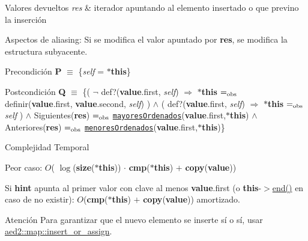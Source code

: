 \begin{DoxyRetVals}{Valores devueltos}
{\em res} & iterador apuntando al elemento insertado o que previno la inserción\\
\hline
\end{DoxyRetVals}
\begin{DoxyParagraph}{Aspectos de aliasing\-:}
Si se modifica el valor apuntado por {\bfseries res}, se modifica la estructura subyacente.
\end{DoxyParagraph}
\begin{DoxyPrecond}{Precondición}
{\bfseries P} $\equiv$ \{{\itshape self} = {\bfseries $\ast$this}\} 
\end{DoxyPrecond}
\begin{DoxyPostcond}{Postcondición}
{\bfseries Q} $\equiv$ \{( $\lnot$ def?({\bfseries value}.first, {\itshape self}) $\Rightarrow$ {\bfseries $\ast$this} $=_{\rm obs}$ definir({\bfseries value}.first, {\bfseries value}.second, {\itshape self}) ) $\land$ ( def?({\bfseries value}.first, {\itshape self}) $\Rightarrow$ {\bfseries $\ast$this} $=_{\rm obs}$ {\itshape self} ) $\land$ Siguientes({\bfseries res}) $=_{\rm obs}$ \href{axiomas.html#mayoresOrdenados}{\tt mayores\-Ordenados}({\bfseries value}.first,{\bfseries $\ast$this}) $\land$ Anteriores({\bfseries res}) $=_{\rm obs}$ \href{axiomas.html#menoresOrdenados}{\tt menores\-Ordenados}({\bfseries value}.first,{\bfseries $\ast$this})\}
\end{DoxyPostcond}

\begin{DoxyDescription}
\item[Complejidad Temporal]
\begin{DoxyItemize}
\item Peor caso\-: $O$( $\log$({\bfseries size}({\bfseries $\ast$this})) $\cdot$ {\bfseries cmp}({\bfseries $\ast$this}) $+$ {\bfseries copy}({\bfseries value}))
\item Si {\bfseries hint} apunta al primer valor con clave al menos {\bfseries value}.first (o {\bfseries this}-\/$>$\hyperlink{classaed2_1_1map_a76023e6a56cb625513e1b5ea028bf983_a76023e6a56cb625513e1b5ea028bf983}{end()} en caso de no existir)\-: $O$({\bfseries cmp}({\bfseries $\ast$this}) $+$ {\bfseries copy}({\bfseries value})) amortizado. 
\end{DoxyItemize}
\end{DoxyDescription}

\begin{DoxyAttention}{Atención}
Para garantizar que el nuevo elemento se inserte sí o sí, usar \hyperlink{classaed2_1_1map_a2ef6723c183916276b0afc4a4c721475_a2ef6723c183916276b0afc4a4c721475}{aed2\-::map\-::insert\-\_\-or\-\_\-assign}. 
\end{DoxyAttention}


